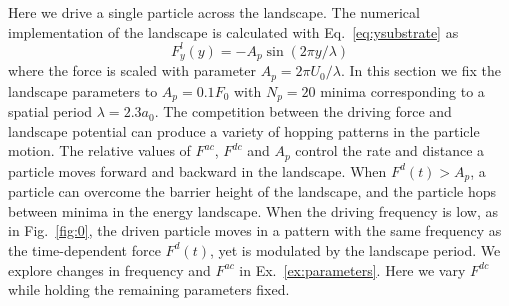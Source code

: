 \documentclass[twocolumn,preprintnumbers,amsmath,amssymb,aps,prx]{revtex4}
\begin{document}
Here we drive 
a single particle %
across the landscape. %
%
The numerical implementation of the landscape 
is calculated with Eq.~\ref{eq:ysubstrate} as 
\begin{equation}
  \label{eq:force}
  F^l_y(y) = -A_{p} \sin{(2 \pi y / \lambda)} 
\end{equation}
where the force is scaled with parameter $A_{p} = 2\pi U_0/\lambda$.
In this section we fix the landscape parameters
to $A_{p} = 0.1 F_0$ %
with $N_p=20$ minima %
corresponding to a spatial period $\lambda = 2.3 a_0$.
The competition between the driving force and landscape potential
can produce a variety of hopping patterns in the particle motion. 
%
The relative values of $F^{ac}$, $F^{dc}$ and $A_p$
control the rate and distance a  particle moves 
forward and backward in the landscape.
When $F^d(t) > A_p$, a particle can 
overcome the barrier height of the landscape,
and 
the particle hops between minima in the energy landscape.
When the driving frequency is low,
as in Fig.~\ref{fig:0},  
the driven particle %
moves %
in a pattern 
with the same frequency 
as the time-dependent force $F^d(t)$,
yet is modulated by the landscape period.
We explore changes in frequency and $F^{ac}$ 
in Ex.~\ref{ex:parameters}.
Here we vary $F^{dc}$ 
while holding the remaining parameters fixed.
\end{document}
